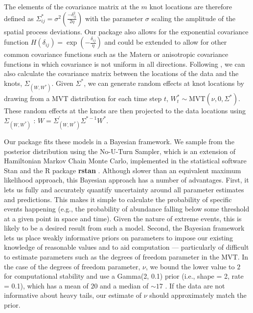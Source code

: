 \documentclass[12pt,english]{article}
\begin{document}
\begin{spacing}{1.25}
The elements of the covariance matrix at the $m$ knot locations are therefore
defined as $\Sigma_{ij}^*=\sigma^2 \left( \frac{-\delta_{ij}^2}{2 \eta}  \right)$ with the
parameter $\sigma$ scaling the amplitude of the spatial process deviations. Our
package also allows for the exponential covariance function $H(\delta_{ij}) =
\exp \left(-\frac{\delta_{ij} }{\eta} \right)$ and could be extended to allow for other
common covariance functions such as the Matern or anisotropic covariance
functions in which covariance is not uniform in all directions.
Following \citet{latimer2009}, we can also calculate the covariance matrix
between the locations of the data and the knots,
$\Sigma_{\left(W, W^* \right)}$.
Given $\Sigma^*$, we can generate random effects at knot
locations by drawing from a MVT distribution for each time step $t$,
$W_t^*\sim \mathrm{MVT}\left( \nu, 0, \Sigma^{*} \right)$.
These random effects at the knots are then projected to the data locations using
$\Sigma_{\left( W,W^{*} \right)}$ \citep{latimer2009}:
$W=\Sigma_{\left(W,W^* \right)}^{'} \Sigma^{*-1}W^*$.

Our package fits these models in a Bayesian framework. We sample
from the posterior distribution using the No-U-Turn Sampler, which is an
extension of Hamiltonian Markov Chain Monte Carlo, implemented in the
statistical software Stan \citep{standevelopmentteam2016a, carpenter2017}
and the R package \textbf{rstan} \citep{standevelopmentteam2016}. Although slower
than an equivalent maximum likelihood approach, this Bayesian approach has a
number of advantages. First, it lets us fully and accurately quantify
uncertainty around all parameter estimates and predictions. This makes it
simple to calculate the probability of specific events happening (e.g., the
probability of abundance falling below some threshold at a given point in space
and time). Given the nature of extreme events, this is likely to be a desired
result from such a model. Second, the Bayesian framework lets us place weakly
informative priors on parameters to impose our existing knowledge of reasonable
values and to aid computation --- particularly of difficult to estimate
parameters such as the degrees of freedom parameter in the MVT. In the case of
the degrees of freedom parameter, $\nu$, we bound the lower value to $2$ for
computational stability and use a Gamma(2, 0.1) prior (i.e., shape = 2, rate = 0.1),
which has a mean of $20$ and a median of $\sim 17$ \citep{juarez2010}.
If the data are not informative about heavy
tails, our estimate of $\nu$ should approximately match the prior.


\end{spacing}
\end{document}
